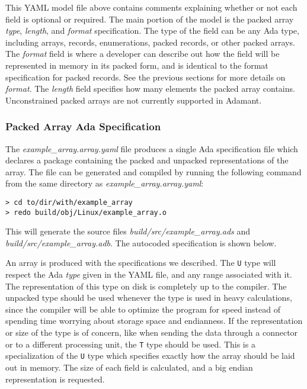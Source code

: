 
This YAML model file above contains comments explaining whether or not each field is optional or required. The main portion of the model is the packed array \textit{type}, \textit{length}, and \textit{format} specification. The type of the field can be any Ada type, including arrays, records, enumerations, packed records, or other packed arrays. The \textit{format} field is where a developer can describe out how the field will be represented in memory in its packed form, and is identical to the format specification for packed records. See the previous sections for more details on \textit{format}. The \textit{length} field specifies how many elements the packed array contains. Unconstrained packed arrays are not currently supported in Adamant.

\subsubsection{Packed Array Ada Specification}

The \textit{example\_array.array.yaml} file produces a single Ada specification file which declares a package containing the packed and unpacked representations of the array. The file can be generated and compiled by running the following command from the same directory as \textit{example\_array.array.yaml}:

\vspace{5mm} %
\begin{verbatim}
> cd to/dir/with/example_array
> redo build/obj/Linux/example_array.o
\end{verbatim}
\vspace{5mm} %

This will generate the source files \textit{build/src/example\_array.ads} and \textit{build/src/example\_array.adb}. The autocoded specification is shown below.


An array is produced with the specifications we described. The \texttt{U} type will respect the Ada \textit{type} given in the YAML file, and any range associated with it. The representation of this type on disk is completely up to the compiler. The unpacked type should be used whenever the type is used in heavy calculations, since the compiler will be able to optimize the program for speed instead of spending time worrying about storage space and endianness. If the representation or size of the type is of concern, like when sending the data through a connector or to a different processing unit, the \texttt{T} type should be used. This is a specialization of the \texttt{U} type which specifies exactly how the array should be laid out in memory. The size of each field is calculated, and a big endian representation is requested.

